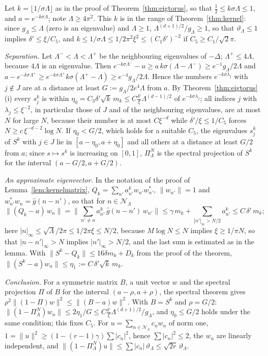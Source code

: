 \documentclass[11pt,a4paper]{article}
\makeatletter
\theoremstyle{stmt}
\theoremstyle{defn}
\theoremstyle{rmk}
\renewenvironment{proof}[1][\proofname]{\par\pushQED{\qed}\normalfont\topsep6\p@\@plus6\p@\relax
  \trivlist\item[\hskip\labelsep{\sffamily\itshape\small #1.}]\ignorespaces}{\popQED\endtrivlist\@endpefalse}
\numberwithin{equation}{section}
\makeatother
\begin{document}
{\begin{proof}
Let $k=\lfloor1/\sigma\Lambda\rfloor$ as in the proof of Theorem~\ref{thm:eigtorus}, so that $\frac12\le k\sigma\Lambda\le1$, and $a=e^{-k\sigma\Lambda}$; note $\Lambda\ge4\pi^2$. This $k$ is in the range of Theorem~\ref{thm:kernel}: since $g_\Lambda\le\Lambda$ (zero is an eigenvalue) and $\Lambda\ge1$, $\Lambda^{(d+1)/2}/g_\Lambda\ge1$, so that $\vartheta_\Lambda\le1$ implies $\delta'\le\xi/C_5$, and $k\le1/\sigma\Lambda\le1/2\pi^2\xi^2\le(C_1\delta')^{-2}$ if $C_5\ge C_1/\sqrt2\pi$.

\emph{Separation.} Let $\Lambda^-<\Lambda<\Lambda^+$ be the neighbouring eigenvalues of $-\Delta$; $\Lambda^+\le4\Lambda$, because $4\Lambda$ is an eigenvalue. Then $e^{-k\sigma\Lambda^-}-a\ge a\,k\sigma(\Lambda-\Lambda^-)\ge e^{-1}g_\Lambda/2\Lambda$ and $a-e^{-k\sigma\Lambda^+}\ge e^{-k\sigma\Lambda^+}k\sigma(\Lambda^+-\Lambda)\ge e^{-4}g_\Lambda/2\Lambda$. Hence the numbers $e^{-k\sigma\lambda_j}$ with $j\notin J$ are at a distance at least $G:=g_\Lambda/2e^4\Lambda$ from $a$. By Theorem~\ref{thm:eigtorus}(i) every $s_j^k$ is within $\eta_0=C_3\delta'\sqrt k\,m_k\le C\frac{\delta'}\xi\Lambda^{(d-1)/2}$ of $e^{-k\sigma\lambda_j}$; all indices $j$ with $\lambda_j\le\xi^{-2}$, in particular those of $J$ and of the neighbouring eigenvalues, are at most $N$ for large $N$, because their number is at most $C\xi^{-d}$ while $\delta'/\xi\le1/C_5$ forces $N\ge c\,\xi^{-d-2}\log N$. If $\eta_0<G/2$, which holds for a suitable $C_5$, the eigenvalues $s_j^k$ of $S^k$ with $j\in J$ lie in $[a-\eta_0,a+\eta_0]$ and all others at a distance at least $G/2$ from $a$; since $s\mapsto s^k$ is increasing on $[0,1]$, $\Pi^N_\Lambda$ is the spectral projection of $S^k$ for the interval $(a-G/2,a+G/2)$.

\emph{An approximate eigenvector.} In the notation of the proof of Lemma~\ref{lem:kernelmatrix}, $Q_k=\sum_{n'}a_{n'}^kw_{n'}w_{n'}^*$, $\|w_{n'}\|=1$ and $w_{n'}^*w_n=\hat g(n-n')$, so that for $n\in\mathcal N_\Lambda$
\[
\big\|(Q_k-a)\,w_n\big\|=\Big\|\sum_{n'\ne n}a_{n'}^k\,\hat g(n-n')\,w_{n'}\Big\|\le\gamma\,m_k+\sum_{|n'|_\infty>N/2}a_{n'}^k\le C\,\delta'\,m_k ;
\]
here $|n|_\infty\le\sqrt\Lambda/2\pi\le1/2\pi\xi\le N/2$, because $M\log N\le N$ implies $\xi\ge1/\pi N$, so that $|n-n'|_\infty>N$ implies $|n'|_\infty>N/2$, and the last sum is estimated as in the lemma. With $\|S^k-Q_k\|\le16\delta m_k+D_k$ from the proof of the theorem, $\|(S^k-a)w_n\|\le\eta_1:=C\,\delta'\sqrt k\,m_k$.

\emph{Conclusion.} For a symmetric matrix $B$, a unit vector $w$ and the spectral projection $\Pi$ of $B$ for the interval $(a-\rho,a+\rho)$, the spectral theorem gives $\rho^2\|(1-\Pi)w\|^2\le\|(B-a)w\|^2$. With $B=S^k$ and $\rho=G/2$: $\|(1-\Pi^N_\Lambda)w_n\|\le2\eta_1/G\le C\frac{\delta'}\xi\Lambda^{(d+1)/2}/g_\Lambda$, and $\eta_0\le G/2$ holds under the same condition; this fixes $C_5$. For $u=\sum_{n\in\mathcal N_\Lambda}c_nw_n$ of norm one, $1=\|u\|^2\ge(1-(r-1)\gamma)\sum|c_n|^2$, hence $\sum|c_n|^2\le2$, the $w_n$ are linearly independent, and $\|(1-\Pi^N_\Lambda)u\|\le\sum|c_n|\,\vartheta_\Lambda\le\sqrt{2r}\,\vartheta_\Lambda$.
\end{proof}

}
\end{document}
